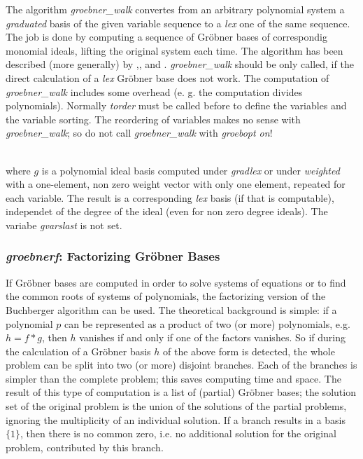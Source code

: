 \hypertarget{operator:GROEBNER_WALK}{}
The algorithm \emph{groebner\_walk} convertes from an arbitrary polynomial
system a \emph{graduated} basis of the given variable sequence to a \emph{lex} one
of the same sequence. The job is done by computing a sequence
of Gr\"obner bases of correspondig monomial ideals, lifting the original
system each time. The algorithm has been described (more generally) by
\cite{AmrheinGloorKuechlin:96a},\cite{AmrheinGloorKuechlin:96b},\cite{AmrheinGloor:98} and \cite{Collart:97}.
\emph{groebner\_walk} should be only called, if the direct calculation of a
\emph{lex} Gr\"obner base does not work. The computation of \emph{groebner\_walk}
includes some overhead (e. g. the computation divides polynomials).
Normally \emph{torder} must be called before to define the variables and the variable
sorting. The reordering of variables makes no sense with \emph{groebner\_walk};
so do not call \emph{groebner\_walk} with \emph{groebopt on}!

\begin{description}
\item[{\it groebner\_walk} $g$]\mbox{}\\
where $g$ is a polynomial ideal basis computed under \emph{gradlex} or under
\emph{weighted} with a one-element, non zero weight vector with only one
element, repeated for each variable. The result is a corresponding
\emph{lex} basis (if that is computable), independet of the degree of the
ideal (even for non zero degree ideals).
The variabe \emph{gvarslast} is not set.
\end{description}

\subsubsection{\emph{groebnerf}: Factorizing Gr\"obner Bases}

\hypertarget{operator:GROEBNERF}{}
If Gr\"obner bases are computed in order to solve systems of
equations or to find the common roots of systems of polynomials,
the factorizing version of the Buchberger algorithm can be used.
The theoretical background is simple: if a polynomial $p$ can be
represented as a product of two (or more) polynomials, e.g. $h= f*g$,
then $h$ vanishes if and only if one of the factors vanishes. So if
during the calculation of a Gr\"obner basis $h$ of the above form is
detected, the whole problem can be split into two (or more)
disjoint branches. Each of the branches is simpler than the complete
problem; this saves computing time and space. The result of this
type of computation is a list of (partial) Gr\"obner bases; the
solution set of the original problem is the union of the solutions of
the partial problems, ignoring the multiplicity of an individual
solution. If a branch results in a basis $\{1\}$, then there is no
common zero, i.e. no additional solution for the original problem,
contributed by this branch.

